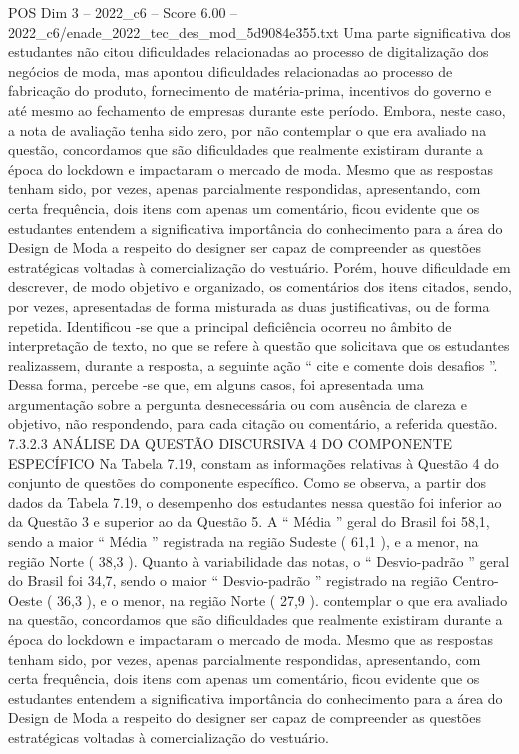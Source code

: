 \begin{textsample}{POS Dim 3 – 2022\_c6 – Score 6.00 – 2022\_c6/enade\_2022\_tec\_des\_mod\_5d9084e355.txt}
Uma parte significativa dos estudantes não citou dificuldades relacionadas ao processo de digitalização dos negócios de moda, mas apontou dificuldades relacionadas ao processo de fabricação do produto, fornecimento de matéria-prima, incentivos do governo e até mesmo ao fechamento de empresas durante este período.
Embora, neste caso, a nota de avaliação tenha sido zero, por não contemplar o que era avaliado na questão, concordamos que são dificuldades que realmente existiram durante a época do lockdown e impactaram o mercado de moda.
Mesmo que as respostas tenham sido, por vezes, apenas parcialmente respondidas, apresentando, com certa frequência, dois itens com apenas um comentário, ficou evidente que os estudantes entendem a significativa importância do conhecimento para a área do Design de Moda a respeito do designer ser capaz de compreender as questões estratégicas voltadas à comercialização do vestuário.
Porém, houve dificuldade em descrever, de modo objetivo e organizado, os comentários dos itens citados, sendo, por vezes, apresentadas de forma misturada as duas justificativas, ou de forma repetida.
Identificou -se que a principal deficiência ocorreu no âmbito de interpretação de texto, no que se refere à questão que solicitava que os estudantes realizassem, durante a resposta, a seguinte ação “ cite e comente dois desafios ”.
Dessa forma, percebe -se que, em alguns casos, foi apresentada uma argumentação sobre a pergunta desnecessária ou com ausência de clareza e objetivo, não respondendo, para cada citação ou comentário, a referida questão. 7.3.2.3 ANÁLISE DA QUESTÃO DISCURSIVA 4 DO COMPONENTE ESPECÍFICO Na Tabela 7.19, constam as informações relativas à Questão 4 do conjunto de questões do componente específico.
Como se observa, a partir dos dados da Tabela 7.19, o desempenho dos estudantes nessa questão foi inferior ao da Questão 3 e superior ao da Questão 5.
A “ Média ” geral do Brasil foi 58,1, sendo a maior “ Média ” registrada na região Sudeste ( 61,1 ), e a menor, na região Norte ( 38,3 ).
Quanto à variabilidade das notas, o “ Desvio-padrão ” geral do Brasil foi 34,7, sendo o maior “ Desvio-padrão ” registrado na região Centro-Oeste ( 36,3 ), e o menor, na região Norte ( 27,9 ). contemplar o que era avaliado na questão, concordamos que são dificuldades que realmente existiram durante a época do lockdown e impactaram o mercado de moda.
Mesmo que as respostas tenham sido, por vezes, apenas parcialmente respondidas, apresentando, com certa frequência, dois itens com apenas um comentário, ficou evidente que os estudantes entendem a significativa importância do conhecimento para a área do Design de Moda a respeito do designer ser capaz de compreender as questões estratégicas voltadas à comercialização do vestuário.

\end{textsample}
